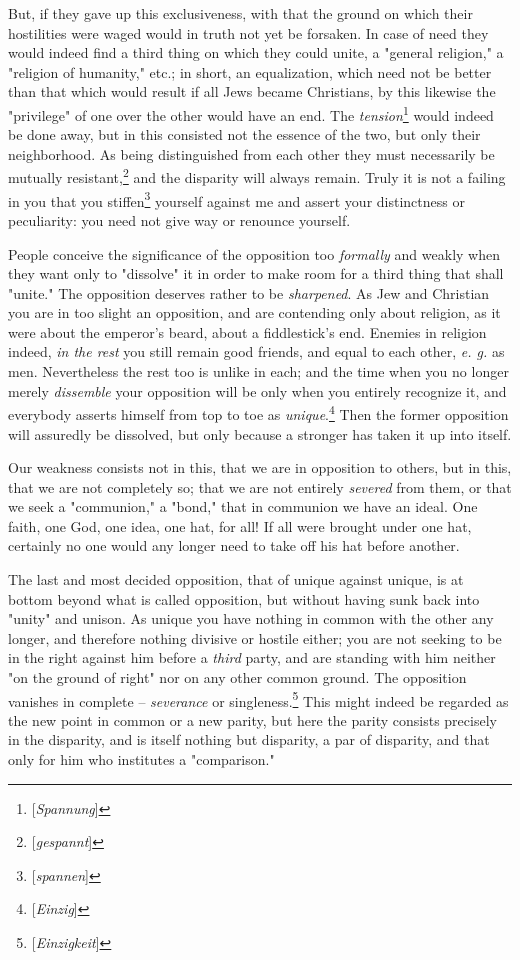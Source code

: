 \documentclass[a4paper]{book}
\begin{document}
But, if they gave up this exclusiveness, with that the ground on which their 
hostilities were waged would in truth not yet be forsaken. In case of need 
they would indeed find a third thing on which they could unite, a "{}general 
religion,"{} a "{}religion of humanity,"{} etc.; in short, an equalization, 
which need not be better than that which would result if all Jews became 
Christians, by this likewise the "{}privilege"{} of one over the other would 
have an end. The \textit{tension}\footnote{[\textit{Spannung}]} would indeed 
be done away, but in this consisted not the essence of the two, but only their 
neighborhood. As being distinguished from each other they must necessarily be 
mutually resistant,\footnote{[\textit{gespannt}]} and the disparity will 
always remain. Truly it is not a failing in you that you 
stiffen\footnote{[\textit{spannen}]} yourself against me and assert your 
distinctness or peculiarity: you need not give way or renounce yourself.

People conceive the significance of the opposition too \textit{formally} and 
weakly when they want only to "{}dissolve"{} it in order to make room for a 
third thing that shall "{}unite."{} The opposition deserves rather to be 
\textit{sharpened}. As Jew and Christian you are in too slight an opposition, 
and are contending only about religion, as it were about the emperor's beard, 
about a fiddlestick's end. Enemies in religion indeed, \textit{in the rest} 
you still remain good friends, and equal to each other, \textit{e. g.} as men. 
Nevertheless the rest too is unlike in each; and the time when you no longer 
merely \textit{dissemble} your opposition will be only when you entirely 
recognize it, and everybody asserts himself from top to toe as 
\textit{unique}.\footnote{[\textit{Einzig}]} Then the former opposition will 
assuredly be dissolved, but only because a stronger has taken it up into 
itself.

Our weakness consists not in this, that we are in opposition to others, but in 
this, that we are not completely so; that we are not entirely \textit{severed} 
from them, or that we seek a "{}communion,"{} a "{}bond,"{} that in communion 
we have an ideal. One faith, one God, one idea, one hat, for all! If all were 
brought under one hat, certainly no one would any longer need to take off his 
hat before another.

The last and most decided opposition, that of unique against unique, is at 
bottom beyond what is called opposition, but without having sunk back into 
"{}unity"{} and unison. As unique you have nothing in common with the other 
any longer, and therefore nothing divisive or hostile either; you are not 
seeking to be in the right against him before a \textit{third} party, and are 
standing with him neither "{}on the ground of right"{} nor on any other common 
ground. The opposition vanishes in complete -- \textit{severance} or 
singleness.\footnote{[\textit{Einzigkeit}]} This might indeed be regarded as 
the new point in common or a new parity, but here the parity consists 
precisely in the disparity, and is itself nothing but disparity, a par of 
disparity, and that only for him who institutes a "{}comparison."{}
\end{document}
